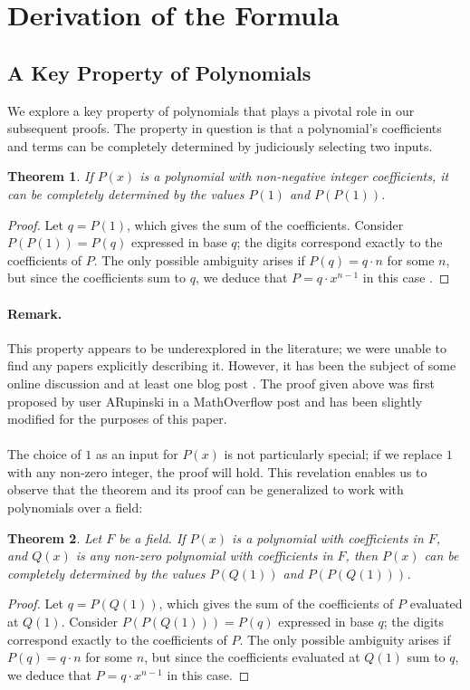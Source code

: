 \documentclass{article}
\theoremstyle{plain}
\newtheorem{thm}{Theorem}
\begin{document}
\section{Derivation of the Formula}

\subsection{A Key Property of Polynomials}
We explore a key property of polynomials that plays a pivotal role in our subsequent proofs. The property in question is that a polynomial's coefficients and terms can be completely determined by judiciously selecting two inputs.

\begin{thm}
\label{thm:1}
If $P(x)$ is a polynomial with non-negative integer coefficients, it can be completely determined by the values $P(1)$ and $P(P(1))$.
\end{thm}

\begin{proof}
Let $q = P(1)$, which gives the sum of the coefficients. Consider $P(P(1)) = P(q)$ expressed in base $q$; the digits correspond exactly to the coefficients of $P$. The only possible ambiguity arises if $P(q) = q\cdot n$ for some $n$, but since the coefficients sum to $q$, we deduce that $P = q \cdot x^{n-1}$ in this case \cite{arupinski}.
\end{proof}

\paragraph{\textbf{Remark.}}
This property appears to be underexplored in the literature; we were unable to find any papers explicitly describing it. However, it has been the subject of some online discussion and at least one blog post \cite{jcook}. The proof given above was first proposed by user ARupinski in a MathOverflow post \cite{arupinski} and has been slightly modified for the purposes of this paper.
\\
\\
The choice of $1$ as an input for $P(x)$ is not particularly special; if we replace $1$ with any non-zero integer, the proof will hold. This revelation enables us to observe that the theorem and its proof can be generalized to work with polynomials over a field:

\begin{thm}
\label{thm:2}
Let $F$ be a field. If $P(x)$ is a polynomial with coefficients in $F$, and $Q(x)$ is any non-zero polynomial with coefficients in $F$, then $P(x)$ can be completely determined by the values $P(Q(1))$ and $P(P(Q(1)))$.
\end{thm}
\begin{proof}
Let $q = P(Q(1))$, which gives the sum of the coefficients of $P$ evaluated at $Q(1)$. Consider $P(P(Q(1))) = P(q)$ expressed in base $q$; the digits correspond exactly to the coefficients of $P$. The only possible ambiguity arises if $P(q) = q\cdot n$ for some $n$, but since the coefficients evaluated at $Q(1)$ sum to $q$, we deduce that $P = q \cdot x^{n-1}$ in this case.
\end{proof}
\end{document}
